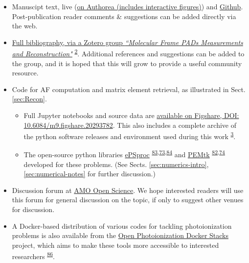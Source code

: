\documentclass[10pt]{article}
\begin{document}
\begin{itemize}
\item Manuscipt text, live (\href{https://www.authorea.com/users/71114/articles/447808-extracting-molecular-frame-photoionization-dynamics-from-experimental-data}{on Authorea (includes interactive figures)}) and \href{https://github.com/phockett/Extracting-Molecular-Frame-Photoionization-Dynamics-from-Experimental-Data}{Github}. Post-publication reader comments \& suggestions can be added directly via the web.
\item \href{https://www.zotero.org/groups/4733878/molecular_frame_pads_measurements_and_reconstruction}{Full bibliography, via a Zotero group \textit{``Molecular Frame PADs Measurements and Reconstruction"}} \textsuperscript{\hyperref[csl:2]{2}}. Additional references and suggestions can be added to the group, and it is hoped that this will grow to provide a useful community resource.
\item Code for AF computation and matrix element retrieval, as illustrated in Sect. \ref{sec:Recon}. 
\begin{itemize}
\item Full Jupyter notebooks and source data are \href{http://dx.doi.org/10.6084/m9.figshare.20293782}{available on Figshare, DOI: 10.6084/m9.figshare.20293782}. This also includes a complete archive of the python software releases and environment used during this work \textsuperscript{\hyperref[csl:3]{3}}.
\item The open-source python libraries \href{https://epsproc.readthedocs.io}{ePSproc} \textsuperscript{\hyperref[csl:83]{83},\hyperref[csl:73]{73},\hyperref[csl:84]{84}} and \href{https://pemtk.readthedocs.io}{PEMtk} \textsuperscript{\hyperref[csl:82]{82},\hyperref[csl:74]{74}} developed for these problems. (See Sects. \ref{sec:numerics-intro}, \ref{sec:numerical-notes} for further discussion.)
\end{itemize}
\item Discussion forum at \href{https://amoopenscience.femtolab.ca/}{AMO Open Science}. We hope interested readers will use this forum for general discussion on the topic, if only to suggest other venues for discussion.
\item A Docker-based distribution of various codes for tackling photoionization problems is also available from the \href{https://github.com/phockett/open-photoionization-docker-stacks}{Open Photoionization Docker Stacks} project, which aims to make these tools more accessible to interested researchers \textsuperscript{\hyperref[csl:86]{86}}.
\end{itemize}
\end{document}
